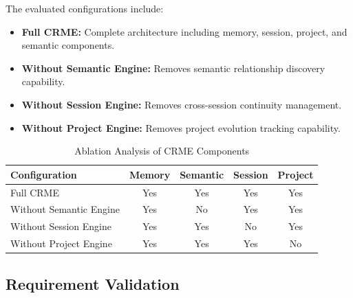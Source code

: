 The evaluated configurations include:


\begin{itemize}


\item
\textbf{Full CRME:}
Complete architecture including memory, session, project,
and semantic components.


\item
\textbf{Without Semantic Engine:}
Removes semantic relationship discovery capability.


\item
\textbf{Without Session Engine:}
Removes cross-session continuity management.


\item
\textbf{Without Project Engine:}
Removes project evolution tracking capability.


\end{itemize}



\begin{table}[t]

\caption{Ablation Analysis of CRME Components}

\label{tab:ablation_study}


\centering
\small


\begin{tabular}{lcccc}

\toprule

Configuration &
Memory &
Semantic &
Session &
Project
\\

\midrule


Full CRME &
Yes &
Yes &
Yes &
Yes
\\


Without Semantic Engine &
Yes &
No &
Yes &
Yes
\\


Without Session Engine &
Yes &
Yes &
No &
Yes
\\


Without Project Engine &
Yes &
Yes &
Yes &
No
\\


\bottomrule


\end{tabular}


\end{table}





\subsection{Requirement Validation}


